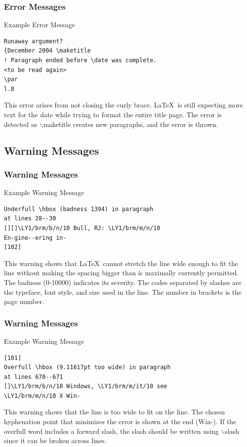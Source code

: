 \documentclass{beamer}
\begin{document}
\begin{frame}[fragile]
\frametitle{Error Messages}

\begin{block}{Example Error Message}
\begin{verbatim}
Runaway argument?
{December 2004 \maketitle
! Paragraph ended before \date was complete.
<to be read again>
\par
l.8
\end{verbatim}
\end{block}

This error arises from not closing the curly brace.  \LaTeX \ is still expecting more text for the date while trying to format the entire title page.  The error is detected as $\backslash$maketitle creates new paragraphs, and the error is thrown.

\end{frame}

\subsection{Warning Messages}

\begin{frame}[fragile]
\frametitle{Warning Messages}

\begin{block}{Example Warning Message}
\begin{verbatim}
Underfull \hbox (badness 1394) in paragraph
at lines 28--30
[][]\LY1/brm/b/n/10 Bull, RJ: \LY1/brm/m/n/10
En-gine--ering in-
[102]
\end{verbatim}
\end{block}

This warning shows that \LaTeX \ cannot stretch the line wide enough to fit the line without making the spacing bigger than is maximally currently permitted.  The badness (0-10000) indicates its severity.  The codes separated by slashes are the typeface, font style, and size used in the line.  The number in brackets is the page number.

\end{frame}

\begin{frame}[fragile]
\frametitle{Warning Messages}

\begin{block}{Example Warning Message}
\begin{verbatim}
[101]
Overfull \hbox (9.11617pt too wide) in paragraph
at lines 670--671
[]\LY1/brm/b/n/10 Windows, \LY1/brm/m/it/10 see
\LY1/brm/m/n/10 X Win-
\end{verbatim}
\end{block}

This warning shows that the line is too wide to fit on the line.  The chosen hyphenation point that minimizes the error is shown at the end (Win-).  If the overfull word includes a forward slash, the slash should be written using $\backslash$slash since it can be broken across lines.

\end{frame}
\end{document}
